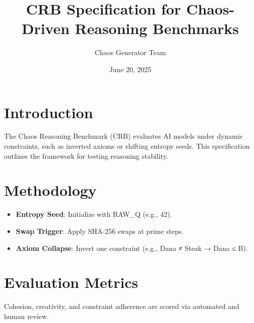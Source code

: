 \documentclass[a4paper,11pt]{article}
\title{CRB Specification for Chaos-Driven Reasoning Benchmarks}
\author{Chaos Generator Team}
\date{June 20, 2025}
\begin{document}
\maketitle
\section{Introduction}
The Chaos Reasoning Benchmark (CRB) evaluates AI models under dynamic constraints, such as inverted axioms or shifting entropy seeds. This specification outlines the framework for testing reasoning stability.
\section{Methodology}
\begin{itemize}
\item \textbf{Entropy Seed}: Initialize with RAW_Q (e.g., 42).
\item \textbf{Swap Trigger}: Apply SHA-256 swaps at prime steps.
\item \textbf{Axiom Collapse}: Invert one constraint (e.g., Dana ≠ Steak → Dana ≤ B).
\end{itemize}
\section{Evaluation Metrics}
Cohesion, creativity, and constraint adherence are scored via automated and human review.
\end{document}

